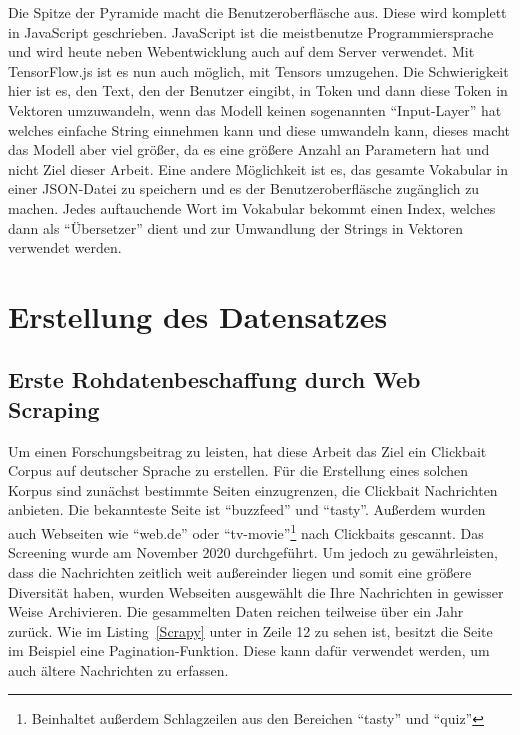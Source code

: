 Die Spitze der Pyramide macht die Benutzeroberfläsche aus. Diese wird komplett in JavaScript geschrieben. JavaScript ist die meistbenutze Programmiersprache und wird heute neben Webentwicklung auch auf dem Server verwendet. Mit TensorFlow.js ist es nun auch möglich, mit Tensors umzugehen. Die Schwierigkeit hier ist es, den Text, den der Benutzer eingibt, in Token und dann diese Token in Vektoren umzuwandeln, wenn das Modell keinen sogenannten \enquote{Input-Layer} hat welches einfache String einnehmen kann und diese umwandeln kann, dieses macht das Modell aber viel größer, da es eine größere Anzahl an Parametern hat und nicht Ziel dieser Arbeit. Eine andere Möglichkeit ist es, das gesamte Vokabular in einer JSON-Datei zu speichern und es der Benutzeroberfläsche zugänglich zu machen. Jedes auftauchende Wort im Vokabular bekommt einen Index, welches dann als \enquote{Übersetzer} dient und zur Umwandlung der Strings in Vektoren verwendet werden.




\section{Erstellung des Datensatzes}
\subsection{Erste Rohdatenbeschaffung durch Web Scraping}

Um einen Forschungsbeitrag zu leisten, hat diese Arbeit das Ziel ein Clickbait Corpus auf deutscher Sprache zu erstellen. Für die Erstellung eines solchen Korpus sind zunächst bestimmte Seiten einzugrenzen, die Clickbait Nachrichten anbieten. Die bekannteste Seite ist \enquote{buzzfeed} und \enquote{tasty}. Außerdem wurden auch Webseiten wie \enquote{web.de} oder \enquote{tv-movie}\footnote{Beinhaltet außerdem Schlagzeilen aus den Bereichen \enquote{tasty} und \enquote{quiz}} nach Clickbaits gescannt. Das Screening wurde am November 2020 durchgeführt. Um jedoch zu gewährleisten, dass die Nachrichten zeitlich weit außereinder liegen und somit eine größere Diversität haben, wurden Webseiten ausgewählt die Ihre Nachrichten in gewisser Weise Archivieren. Die gesammelten Daten reichen teilweise über ein Jahr zurück. Wie im Listing~\ref{Scrapy} unter in Zeile 12 zu sehen ist, besitzt die Seite im Beispiel eine Pagination-Funktion. Diese kann dafür verwendet werden, um auch ältere Nachrichten zu erfassen.

